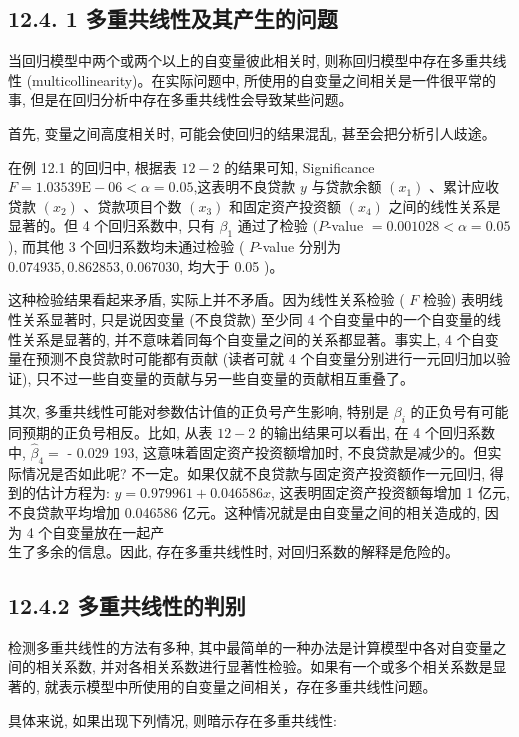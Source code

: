 \documentclass[10pt]{article}
\begin{document}
\begin{CJK*}{UTF8}{bsmi}
\subsection*{12.4. 1 多重共线性及其产生的问题}
当回归模型中两个或两个以上的自变量彼此相关时, 则称回归模型中存在多重共线性 (multicollinearity)。在实际问题中, 所使用的自变量之间相关是一件很平常的事, 但是在回归分析中存在多重共线性会导致某些问题。

首先, 变量之间高度相关时, 可能会使回归的结果混乱, 甚至会把分析引人歧途。

在例 12.1 的回归中, 根据表 $12-2$ 的结果可知, Significance $F=1.03539 \mathrm{E}-06<\alpha=0.05$,这表明不良贷款 $y$ 与贷款余额 $\left(x_{1}\right)$ 、累计应收贷款 $\left(x_{2}\right)$ 、贷款项目个数 $\left(x_{3}\right)$ 和固定资产投资额 $\left(x_{4}\right)$ 之间的线性关系是显著的。但 4 个回归系数中, 只有 $\beta_{1}$ 通过了检验 $(P$-value $=0.001028<\alpha=0.05$ ), 而其他 3 个回归系数均未通过检验 ( $P$-value 分别为 $0.074935,0.862853,0.067030$, 均大于 0.05 )。

这种检验结果看起来矛盾, 实际上并不矛盾。因为线性关系检验 ( $F$ 检验) 表明线性关系显著时, 只是说因变量 (不良贷款) 至少同 4 个自变量中的一个自变量的线性关系是显著的, 并不意味着同每个自变量之间的关系都显著。事实上, 4 个自变量在预测不良贷款时可能都有贡献 (读者可就 4 个自变量分别进行一元回归加以验证), 只不过一些自变量的贡献与另一些自变量的贡献相互重叠了。

其次, 多重共线性可能对参数估计值的正负号产生影响, 特别是 $\beta_{i}$ 的正负号有可能同预期的正负号相反。比如, 从表 $12-2$ 的输出结果可以看出, 在 4 个回归系数中, $\hat{\beta}_{4}=$ - 0.029 193, 这意味着固定资产投资额增加时, 不良贷款是减少的。但实际情况是否如此呢? 不一定。如果仅就不良贷款与固定资产投资额作一元回归, 得到的估计方程为: $\hat{y}=0.979961+0.046586 x$, 这表明固定资产投资额每增加 1 亿元, 不良贷款平均增加 0.046586 亿元。这种情况就是由自变量之间的相关造成的, 因为 4 个自变量放在一起产\\
生了多余的信息。因此, 存在多重共线性时, 对回归系数的解释是危险的。

\subsection*{12.4.2 多重共线性的判别}
检测多重共线性的方法有多种, 其中最简单的一种办法是计算模型中各对自变量之间的相关系数, 并对各相关系数进行显著性检验。如果有一个或多个相关系数是显著的, 就表示模型中所使用的自变量之间相关，存在多重共线性问题。

具体来说, 如果出现下列情况, 则暗示存在多重共线性:


\end{CJK*}
\end{document}
